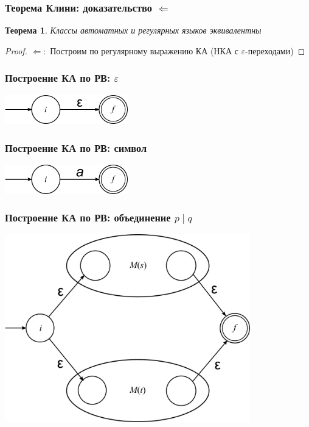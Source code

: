 \documentclass{beamer}
\newtheorem{rutheorem}{Теорема}
\begin{document}
\begin{frame}
  \transwipe[direction=90]
  \frametitle{Теорема Клини: доказательство $\Leftarrow$}
  
  \begin{rutheorem}
   Классы автоматных и регулярных языков \emph{эквивалентны}
  \end{rutheorem}
  
  \begin{proof}
    $\Leftarrow:$ Построим по регулярному выражению КА (НКА с $\varepsilon$-переходами)
  \end{proof}
\end{frame}

\begin{frame}
  \transwipe[direction=90]
  \frametitle{Построение КА по РВ: $\varepsilon$}
    \begin{center}
      \includegraphics[width=0.40\textwidth]{pics/epsilon.png}  
    \end{center}
\end{frame}

\begin{frame}
  \transwipe[direction=90]
  \frametitle{Построение КА по РВ: символ}
    \begin{center}
      \includegraphics[width=0.40\textwidth]{pics/terminal.png}  
    \end{center}
\end{frame}

\begin{frame}
  \transwipe[direction=90]
  \frametitle{Построение КА по РВ: объединение $p \mid q$}
    \begin{center}
      \includegraphics[width=0.80\textwidth]{pics/union.png}  
    \end{center}
\end{frame}
\end{document}
